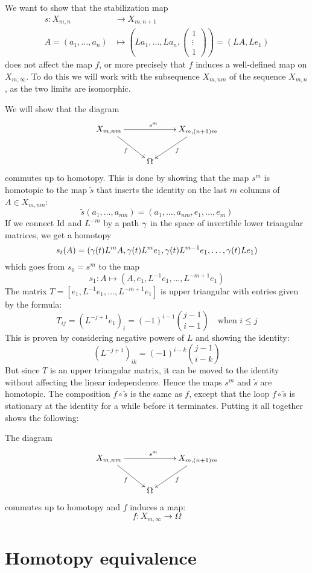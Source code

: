 We want to show that the stabilization map
\begin{align*}
  s : X_{m,n} &\to X_{m,n+1} \\
  A = (a_1,\dots,a_n) &\mapsto \left(La_1,\dots,La_n,
    \begin{pmatrix}
      1 \\
      \vdots\\
      1
    \end{pmatrix} 
\right) = (LA,Le_1)
\end{align*}
does not affect the map $f$, or more precisely that $f$ induces a
well-defined map on $X_{m,\infty}$. To do this we will work with the
subsequence $X_{m,nm}$ of the sequence $X_{m,n}$, as the two limits
are isomorphic.

We will show that the diagram
\[ \xymatrix{ X_{m,nm} \ar[rr]^{s^m}\ar[dr]_f & & X_{m,(n+1)m} \ar[dl]^f \\
  & \Omega & } \]
commutes up to homotopy. This is done by showing that the map $s^m$ is
homotopic to the map $\widetilde s$ that inserts the identity on the
last $m$ columns of $A \in X_{m,nm}$:
\[ \widetilde s (a_1,\dots,a_{nm}) = (a_1,\dots,a_{nm},e_1,\dots,e_m) \]
If we connect $\operatorname{Id}$ and $L^{-m}$ by a path $\gamma$ in the space of
invertible lower triangular matrices, we get a homotopy
\[ s_t(A) = (\gamma(t)L^mA,
\gamma(t)L^me_1,\gamma(t)L^{m-1}e_1,\dots,\gamma(t)Le_1) \]
which goes from $s_0 = s^m$ to the map
\[ s_1 : A \mapsto (A,e_1,L^{-1}e_1,\dots,L^{-m+1}e_1) \]
The matrix $T = [e_1,L^{-1}e_1,\dots,L^{-m+1}e_1]$ is upper
triangular with entries given by the formula:
\[ T_{ij} = (L^{-j+1}e_1)_i = (-1)^{i-1}\binom{j-1}{i-1} \quad
\text{when } i \leq j \]
This is proven by considering negative powers of $L$ and showing the
identity:
\[ (L^{-j+1})_{ik} = (-1)^{i-k}\binom{j-1}{i-k} \]
But since $T$ is an upper triangular matrix, it can be moved to the
identity without affecting the linear independence.
Hence the maps $s^m$ and $\widetilde s$ are homotopic. The composition
$f\circ \widetilde s$ is the same as $f$, except that the loop
$f\circ\widetilde s$ is stationary at the identity for a while before
it terminates. Putting it all together shows the following:
\begin{lemma}
  The diagram
  \[ \xymatrix{ X_{m,nm} \ar[rr]^{s^m}\ar[dr]_{f} & & \ar[dl]^f
    X_{m,(n+1)m} \\
    & \Omega & } \]
  commutes up to homotopy and $f$ induces a map:
  \[ f : X_{m,\infty} \to \Omega \]
\end{lemma}

\section{Homotopy equivalence}

